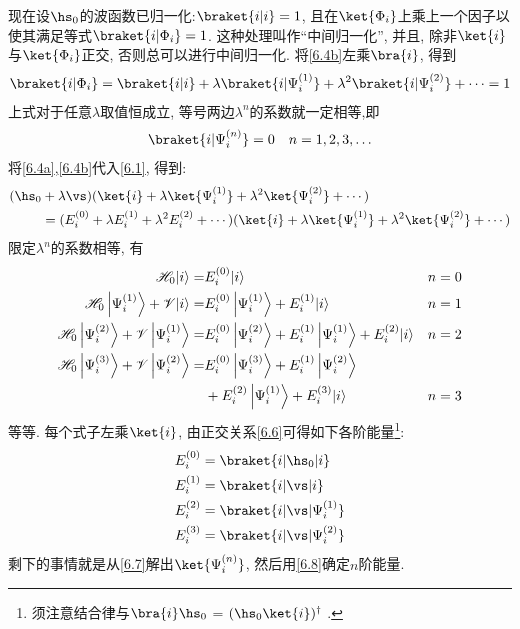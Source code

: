 现在设$\hs_0$的波函数已归一化:$\braket{i|i}=1$, 
且在$\ket{\Phi_i}$上乘上一个因子以使其满足等式$\braket{i|\Phi_i}=1$. 
这种处理叫作``中间归一化'', 
并且, 
除非$\ket{i}$与$\ket{\Phi_i}$正交, 
否则总可以进行中间归一化. 
将\autoref{6.4b}左乘$\bra{i}$, 
得到
\begin{align}
\braket{i|\Phi_i}=\braket{i|i}+\lambda\braket{i|\Psi_i^{(1)}}+\lambda^2\braket{i|\Psi_i^{(2)}} + \cdots = 1
\end{align}
上式对于任意$\lambda$取值恒成立,
等号两边$\lambda ^n$的系数就一定相等,即
\begin{align}
\braket{i|\Psi_i^{(n)}} = 0~~~ \hfill n=1,2,3,\ldots
\label{6.6}
\end{align}
将\autoref{6.4a},\autoref{6.4b}代入\autoref{6.1}, 
得到:
\begin{align*}
(\hs_0&+\lambda\vs)(\ket{i}+\lambda\ket{\Psi_i^{(1)}} + \lambda^2 \ket{\Psi_i^{(2)}} +\cdots )\\
&=(E_i^{(0)} + \lambda E_i^{(1)} + \lambda^2 E_i^{(2)}  + \cdots )(\ket{i}+\lambda\ket{\Psi_i^{(1)}} + \lambda^2 \ket{\Psi_i^{(2)}} +\cdots)
\end{align*}
限定$\lambda^n$的系数相等,
有
\begin{subequations}\label{6.7}
	\begin{align}
		\mathscr{H}_0|i\rangle=& E_i^{(0)}|i\rangle & & n=0 \\\label{6.7b}
		\mathscr{H}_0\left|\Psi_i^{(1)}\right\rangle+\mathscr{V}|i\rangle=& E_i^{(0)}\left|\Psi_i^{(1)}\right\rangle+E_i^{(1)}|i\rangle & & n=1 \\\label{6.7c}
		\mathscr{H}_0\left|\Psi_i^{(2)}\right\rangle+\mathscr{V}\left|\Psi_i^{(1)}\right\rangle=& E_i^{(0)}\left|\Psi_i^{(2)}\right\rangle+E_i^{(1)}\left|\Psi_i^{(1)}\right\rangle+E_i^{(2)}|i\rangle & & n=2 \\\label{6.7d}
		\mathscr{H}_0\left|\Psi_i^{(3)}\right\rangle+\mathscr{V}\left|\Psi_i^{(2)}\right\rangle=& E_i^{(0)}\left|\Psi_i^{(3)}\right\rangle+E_i^{(1)}\left|\Psi_i^{(2)}\right\rangle & \notag \\
		&+E_i^{(2)}\left|\Psi_i^{(1)}\right\rangle+E_i^{(3)}|i\rangle & & n=3
	\end{align}
\end{subequations}
等等. 
每个式子左乘$\ket{i}$, 
由正交关系\autoref{6.6}可得如下各阶能量\footnote{
须注意结合律与$\bra{i}\hs_0$ = $(\hs_0 \ket{i})^\dagger$ .
}:
\begin{subequations}\label{6.8}
\begin{align}\label{6.8a}
E_i^{(0)} &= \braket{i|\hs_0|i} \\\label{6.8b}
E_i^{(1)} &= \braket{i|\vs|i} \\\label{6.8c}
E_i^{(2)} &= \braket{i|\vs|\Psi_i^{(1)}} \\\label{6.8d}
E_i^{(3)} &= \braket{i|\vs|\Psi_i^{(2)}}
\end{align}
\end{subequations}
剩下的事情就是从\autoref{6.7}解出$\ket{\Psi_i^{(n)}}$, 
然后用\autoref{6.8}确定$n$阶能量.


